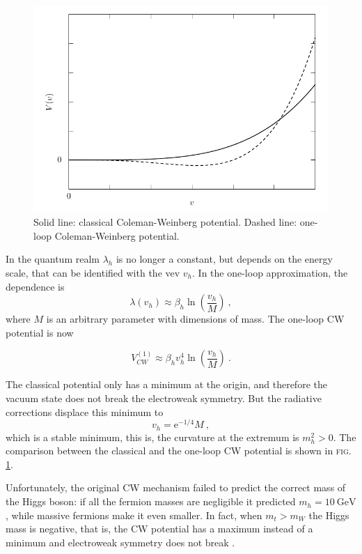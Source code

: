 \documentclass[aps,prd,preprintnumbers,nofootinbibn,twocolumn]{revtex4}
\begin{document}
\begin{figure}[t]
\centering
\includegraphics[width=\columnwidth]{potential}
\caption{Solid line: classical Coleman-Weinberg potential. Dashed line: one-loop Coleman-Weinberg potential.}\label{fig:CWpotential}
\end{figure}

In the quantum realm $\lambda_h$ is no longer a constant, but depends on the energy scale, that can be identified with the vev $v_h$. In the one-loop approximation, the dependence is
\begin{equation}
\lambda(v_h) \approx \beta_h \ln\left(\frac{v_h}{M}\right)\ ,
\end{equation}
where $M$ is an arbitrary parameter with dimensions of mass. The one-loop CW potential is now

\begin{equation}
V_{CW}^{(1)} \approx \beta_h v_h^4 \ln \left(\frac{v_h}{M}\right)\ .
\end{equation}

The classical potential only has a minimum at the origin, and therefore the vacuum state does not break the electroweak symmetry. But the radiative corrections displace this minimum to
\begin{equation}
v_h = \mathrm{e}^{-1/4} M\ ,
\end{equation}
which is a stable minimum, this is, the curvature at the extremum is $m_h^2 > 0$. The comparison between the classical and the one-loop CW potential is shown in \textsc{fig.} \ref{fig:CWpotential}.

Unfortunately, the original CW mechanism failed to predict the correct mass of the Higgs boson: if all the fermion masses are negligible it predicted $m_h = \SI{10}{\giga\electronvolt}$, while massive fermions make it even smaller. In fact, when $m_t > m_W$ the Higgs mass is negative, that is, the CW potential has a maximum instead of a minimum and electroweak symmetry does not break \cite{gunion2008higgs}.
\end{document}
